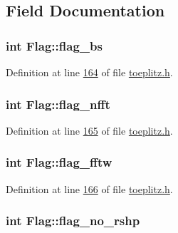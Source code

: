 \subsection{Field Documentation}
\hypertarget{structFlag_abeb9784f834d231864f1a722c7d79398}{
\subsubsection[{flag\-\_\-bs}]{\setlength{\rightskip}{0pt plus 5cm}int Flag\-::flag\-\_\-bs}}\label{structFlag_abeb9784f834d231864f1a722c7d79398}


Definition at line \hyperlink{toeplitz_8h_source_l00164}{164} of file \hyperlink{toeplitz_8h_source}{toeplitz.\-h}.

\hypertarget{structFlag_a6c22a65604c9dd03d58ecf602bb67952}{
\subsubsection[{flag\-\_\-nfft}]{\setlength{\rightskip}{0pt plus 5cm}int Flag\-::flag\-\_\-nfft}}\label{structFlag_a6c22a65604c9dd03d58ecf602bb67952}


Definition at line \hyperlink{toeplitz_8h_source_l00165}{165} of file \hyperlink{toeplitz_8h_source}{toeplitz.\-h}.

\hypertarget{structFlag_adf245cb515d8a26bdc70c7226d3dfb39}{
\subsubsection[{flag\-\_\-fftw}]{\setlength{\rightskip}{0pt plus 5cm}int Flag\-::flag\-\_\-fftw}}\label{structFlag_adf245cb515d8a26bdc70c7226d3dfb39}


Definition at line \hyperlink{toeplitz_8h_source_l00166}{166} of file \hyperlink{toeplitz_8h_source}{toeplitz.\-h}.

\hypertarget{structFlag_a59bc77f2a4fd6e11947b65033c9dea25}{
\subsubsection[{flag\-\_\-no\-\_\-rshp}]{\setlength{\rightskip}{0pt plus 5cm}int Flag\-::flag\-\_\-no\-\_\-rshp}}\label{structFlag_a59bc77f2a4fd6e11947b65033c9dea25}


